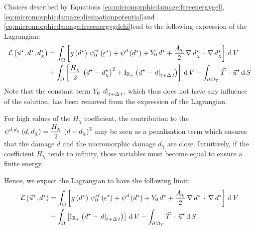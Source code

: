 Choices described by Equations \eqref{eq:micromorphicdamage:freeenergygel},
\eqref{eq:micromorphicdamage:dissipationpotential}and
\eqref{eq:micromorphicdamage:freeenergygdchi}lead to the following expression
of the Lagrangian:
\[
\begin{aligned}
\mathcal{L}\left(\vec{u}^{\star},d^{\star},d_{\chi}^{\star}\right)
&=\int_{\Omega}
\left[
g\left(d^{\star}\right)\,{\psi}^{el}_{0}\left(\underline{\epsilon}^{\star}\right)+
{\psi}^{d}\left(d^{\star}\right)+
Y_{0}\,d^{\star}
+\displaystyle \frac{\displaystyle A_{\chi}}{\displaystyle 2}\,\nabla\, d_{\chi}^{\star}\,\cdot\,\nabla\, d_{\chi}^{\star}
\right]
\,\mathrm{d}\,V\\
&+\int_{\Omega}
\left[
\displaystyle \frac{\displaystyle H_{\chi}}{\displaystyle 2}\,\left(d^{\star}-d_{\chi}^{\star}\right)^{2}+
\mathrm{I}_{\mathbb{R}_{+}}\left(d^{\star}-\left.d\right|_{t+\Delta\,t}\right) 
\right]
\,\mathrm{d}\,V
- \int_{\partial\,\Omega_{T}} \vec{T}\,\cdot\,\vec{u}^{\star} \,\mathrm{d}\,S
\end{aligned}
\]\label{eq:micromorphicdamage:Lagrangian}
Note that the constant term \(Y_{0}\,\left.d\right|_{t+\Delta\,t}\), which thus does not have
any influence of the solution, has been removed from the expression of
the Lagrangian.

For high values of the \(H_{\chi}\) coefficient, the contribution to the
\({\psi}^{d, d_{\chi}}\left(d,
d_{\chi}\right)=\displaystyle \frac{\displaystyle H_{\chi}}{\displaystyle 2}\,\left(d-d_{\chi}\right)^{2}\) may be seen as a
penalisation term which ensures that the damage \(d\) and the
micromorphic damage \(d_{\chi}\) are close. Intuitively, if the
coefficient \(H_{\chi}\) tends to infinity, those variables must become
equal to ensure a finite energy.

Hence, we expect the Lagrangian to have the following limit:
\[
\begin{aligned}
\mathcal{L}\left(\vec{u}^{\star},d^{\star}\right)
&=\int_{\Omega}
\left[
g\left(d^{\star}\right)\,{\psi}^{el}_{0}\left(\underline{\epsilon}^{\star}\right)+
{\psi}^{d}\left(d^{\star}\right)+
Y_{0}\,d^{\star}
+\displaystyle \frac{\displaystyle A_{\chi}}{\displaystyle 2}\,\nabla\, d^{\star}\,\cdot\,\nabla\, d^{\star}
\right]
\,\mathrm{d}\,V\\
&+\int_{\Omega}
\left[
\mathrm{I}_{\mathbb{R}_{+}}\left(d^{\star}-\left.d\right|_{t+\Delta\,t}\right) 
\right]
\,\mathrm{d}\,V
- \int_{\partial\,\Omega_{T}} \vec{T}\,\cdot\,\vec{u}^{\star} \,\mathrm{d}\,S
\end{aligned}
\]\label{eq:micromorphicdamage:LagrangianLimit}

